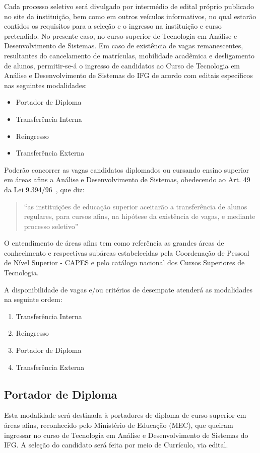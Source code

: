 \documentclass[11pt,fleqn]{book} %
\begin{document}
Cada processo seletivo será divulgado por intermédio de edital próprio publicado no site da instituição, bem como em outros veículos informativos, no qual estarão contidos os requisitos para a seleção e o ingresso na instituição e curso pretendido. 
No presente caso, no curso superior de Tecnologia em Análise e Desenvolvimento de Sistemas.
Em caso de existência de vagas remanescentes, resultantes do cancelamento de matrículas, mobilidade acadêmica e desligamento de alunos, permitir-se-á o ingresso de candidatos ao Curso de Tecnologia em Análise e Desenvolvimento de Sistemas do IFG de acordo com editais específicos nas seguintes modalidades: 
\begin{itemize}
	\item Portador de Diploma
	\item Transferência Interna
	\item Reingresso
	\item Transferência Externa
\end{itemize}

Poderão concorrer as vagas candidatos diplomados ou cursando ensino superior em áreas afins a Análise e Desenvolvimento de Sistemas, obedecendo ao Art. 49 da Lei 9.394/96~\cite{Lei19394De1996}, que diz: 
\begin{quote}
	``as instituições de educação superior aceitarão a transferência de alunos regulares, para cursos afins, na hipótese da
	existência de vagas, e mediante processo seletivo''~\cite{Lei19394De1996}
\end{quote}

O entendimento de áreas afins tem como referência as grandes áreas de conhecimento e respectivas subáreas estabelecidas pela Coordenação de Pessoal de Nível Superior - CAPES e pelo catálogo nacional dos Cursos Superiores de Tecnologia.

A disponibilidade de vagas e/ou critérios de desempate atenderá as modalidades na seguinte ordem:
\begin{enumerate}
	\item Transferência Interna
	\item Reingresso
	\item Portador de Diploma
	\item Transferência Externa
\end{enumerate}

\subsection{Portador de Diploma}
Esta modalidade será destinada à portadores de diploma de curso superior em áreas afins, reconhecido pelo Ministério de Educação (MEC), que queiram ingressar no curso de Tecnologia em Análise e Desenvolvimento de Sistemas do IFG. A seleção do candidato será feita por meio de Currículo, via edital.
\end{document}
